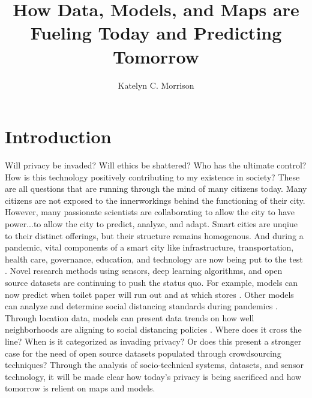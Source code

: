 \documentclass[12pt]{article}
\title{
    How Data, Models, and Maps are Fueling Today and Predicting Tomorrow
}
\author{Katelyn C. Morrison}
\begin{document}
\maketitle

\section*{Introduction}
Will privacy be invaded? Will ethics be shattered? Who has the ultimate control? How
is this technology positively contributing to my existence in society?
These are all questions that are running through the mind of many citizens today. 
Many citizens are not exposed to the innerworkings behind the functioning of their city.
However, many passionate scientists are collaborating to allow the city to have power...to allow the city to predict, analyze, and adapt.
Smart cities are unqiue to their distinct offerings, but their structure remains homogenous. 
And during a pandemic, vital components of a smart city like infrastructure, transportation, 
health care, governance, education, and technology are now being put to the test \cite{DefiningSmartCities}.
Novel research methods using sensors, deep learning algorithms, and open source datasets are continuing to push the status quo. 
For example, models can now predict
when toilet paper will run out and at which stores \cite{GotTP}. Other models can analyze and determine
social distancing standards during pandemics \cite{das_james_2020}. Through location data,
models can present data trends on how well neighborhoods are aligning to social distancing policies \cite{gazette_2020}.
Where does it cross the line? When is it categorized as invading privacy? Or does this present a
stronger case for the need of open source datasets populated through crowdsourcing techniques? 
Through the analysis of socio-technical systems, datasets, and sensor technology, 
it will be made clear how today's privacy is being sacrificed and how tomorrow is relient on maps and models.
\end{document}

